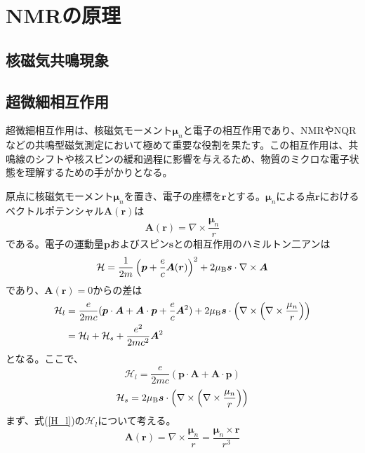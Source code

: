 \documentclass[11pt,a4j]{jreport}
\begin{document}
\chapter{NMRの原理}
\section{核磁気共鳴現象}

\section{超微細相互作用}
超微細相互作用は、核磁気モーメント$\bm \mu_n$と電子の相互作用であり、NMRやNQRなどの共鳴型磁気測定において極めて重要な役割を果たす。この相互作用は、共鳴線のシフトや核スピンの緩和過程に影響を与えるため、物質のミクロな電子状態を理解するための手がかりとなる。\par
原点に核磁気モーメント$\bm \mu_n$を置き、電子の座標を$\bm r$とする。$\bm \mu_n$による点$\bm r$におけるベクトルポテンシャル$\bm A(\bm r)$は
\begin{equation}
  \bm A(\bm r)=\nabla\times \frac{\bm \mu_n}{r}
\end{equation}
である。電子の運動量$\bm p$およびスピン$\bm s$との相互作用のハミルトン二アンは
\begin{equation}
  \mathcal{H} = \frac{1}{2m}\left(\bm p + \frac{e}{c}\bm A(\bm r)\right)^2 + 2\mu_{\text B} \bm s\cdot\nabla\times\bm A
  \label{H}
\end{equation}
であり、$\bm A(\bm r)=0$からの差は
\begin{align} 
    \mathcal{H}_l&=\frac{e}{2mc}(\bm p\cdot \bm A+\bm A\cdot\bm p+\frac{e}{c}\bm A^2)+2\mu_{\text B}\bm s\cdot\left(\nabla\times\left(\nabla\times\frac{\mu_n}{r}\right)\right)\\
    &=\mathcal{H}_l+\mathcal{H}_s+\frac{e^2}{2mc^2}\bm A^2
\end{align}
となる。ここで、
\begin{equation}
  \mathcal{H}_l=\frac{e}{2mc}(\bm p\cdot\bm A + \bm A \cdot \bm p)
  \label{H_l}
\end{equation}
\begin{equation}
  \mathcal{H}_s=2\mu_{\text B}\bm s\cdot\left(\nabla\times\left(\nabla\times\frac{\mu_n}{r}\right)\right)
  \label{H_s}
\end{equation}
まず、式(\ref{H_l})の$\mathcal{H}_l$について考える。
\begin{equation}
  \bm A(\bm r)=\nabla\times\frac{\bm \mu_n}{r}=\frac{\bm \mu_n\times\bm r}{r^3}
\end{equation}
\end{document}
